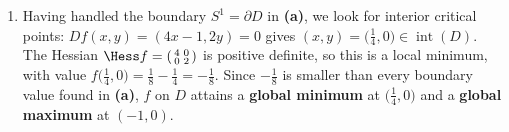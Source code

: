 \begin{exercisesolution}
\label{sol:extrema_circle_disk_interior}
\begin{enumerate}[label=\textbf{(\alph*)}, start=2]
  \item Having handled the boundary $S^1 = \partial D$ in \textbf{(a)}, we look for interior
    critical points: $Df(x,y) = (4x-1, 2y) = 0$ gives $(x,y) = \big(\tfrac14, 0\big) \in
    \operatorname{int}(D)$. The Hessian $\Hess f = \left(\begin{smallmatrix} 4 & 0 \\ 0 & 2\end{smallmatrix}\right)$ is
    positive definite, so this is a local minimum, with value $f\big(\tfrac14,0\big) =
    \tfrac18 - \tfrac14 = -\tfrac18$. Since $-\tfrac18$ is smaller than every boundary value found
    in \textbf{(a)}, $f$ on $D$ attains a \textbf{global minimum} at $\big(\tfrac14,0\big)$ and a
    \textbf{global maximum} at $(-1,0)$.
\end{enumerate}
\end{exercisesolution}

